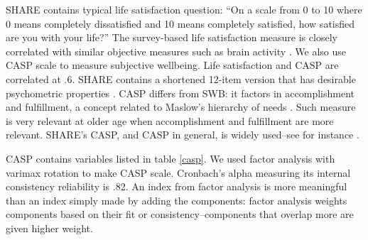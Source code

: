 \documentclass[10pt, letterpaper]{article}
\begin{document}
\begin{spacing}{1.4}
SHARE contains typical life satisfaction question: %
``On a scale from 0 to 10 where 0 means completely dissatisfied and 10 means
completely satisfied, how satisfied
are you with your life?'' The survey-based life
 satisfaction measure is closely correlated with similar objective
 measures such as brain activity \citep{layard05}.
 We also use CASP scale to measure subjective
wellbeing. Life satisfaction and CASP are correlated at .6.  SHARE contains a shortened 12-item version that has
desirable psychometric properties \citep{knesbeck2005quality}. CASP differs from
SWB: it factors in accomplishment and fulfillment, a concept related to Maslow's
hierarchy of needs \citep{maslow87}. Such measure is  very relevant at older age
when accomplishment and fulfillment are more relevant. %
 SHARE's CASP, and CASP in general, is widely used--see for instance  \citet{perez2017psychometric,amit2010subjective,hyde03,hyde15,hyde2003measure,kim2015psychometric}. 

CASP contains  variables listed in table \ref{casp}. We used factor
analysis with varimax rotation to make CASP scale. Cronbach's alpha measuring its internal
consistency reliability is .82.  An index from factor analysis is more
meaningful than an index simply made by adding the components: factor analysis
weights components based on their fit or consistency--components that overlap
more are given higher weight.


\end{spacing}
\end{document}
